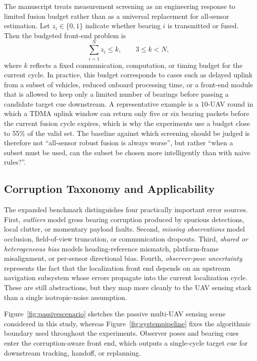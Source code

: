 \documentclass[drones,article,submit,pdftex,moreauthors]{Definitions/mdpi}
\begin{document}
The manuscript treats measurement screening as an engineering response to limited fusion budget rather than as a universal replacement for all-sensor estimation. Let $z_i\in\{0,1\}$ indicate whether bearing $i$ is transmitted or fused. Then the budgeted front-end problem is
\begin{equation}
\sum_{i=1}^{N} z_i \leq k,\qquad 3 \leq k < N,
\end{equation}
where $k$ reflects a fixed communication, computation, or timing budget for the current cycle. In practice, this budget corresponds to cases such as delayed uplink from a subset of vehicles, reduced onboard processing time, or a front-end module that is allowed to keep only a limited number of bearings before passing a candidate target cue downstream. A representative example is a 10-UAV round in which a TDMA uplink window can return only five or six bearing packets before the current fusion cycle expires, which is why the experiments use a budget close to 55\% of the valid set. The baseline against which screening should be judged is therefore not ``all-sensor robust fusion is always worse'', but rather ``when a subset must be used, can the subset be chosen more intelligently than with naive rules?''.

\subsection{Corruption Taxonomy and Applicability}

The expanded benchmark distinguishes four practically important error sources. First, \emph{outliers} model gross bearing corruption produced by spurious detections, local clutter, or momentary payload faults. Second, \emph{missing observations} model occlusion, field-of-view truncation, or communication dropouts. Third, \emph{shared or heterogeneous bias} models heading-reference mismatch, platform-frame misalignment, or per-sensor directional bias. Fourth, \emph{observer-pose uncertainty} represents the fact that the localization front end depends on an upstream navigation subsystem whose errors propagate into the current localization cycle. These are still abstractions, but they map more cleanly to the UAV sensing stack than a single isotropic-noise assumption.

Figure~\ref{fig:passivescenario} sketches the passive multi-UAV sensing scene considered in this study, whereas Figure~\ref{fig:systempipeline} fixes the algorithmic boundary used throughout the experiments. Observer poses and bearing cues enter the corruption-aware front end, which outputs a single-cycle target cue for downstream tracking, handoff, or replanning.
\end{document}
